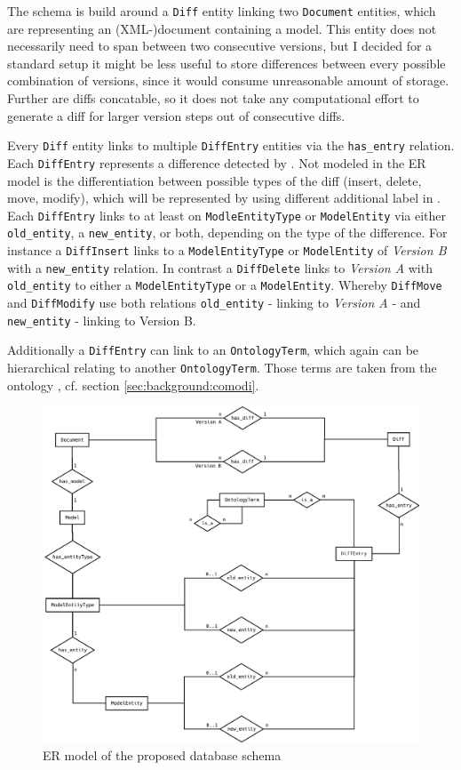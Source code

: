 The schema is build around a \texttt{Diff} entity linking two \texttt{Document} entities, which are representing an (XML-)document containing a model. This entity does not necessarily need to span between two consecutive versions, but I decided for a standard setup it might be less useful to store differences between every possible combination of versions, since it would consume unreasonable amount of storage. Further are diffs concatable, so it does not take any computational effort to generate a diff for larger version steps out of consecutive diffs.

Every \texttt{Diff} entity links to multiple \texttt{DiffEntry} entities via the \texttt{has\_entry} relation. Each \texttt{DiffEntry} represents a difference detected by \bives \cite{Scharm2015}. Not modeled in the ER model is the differentiation between possible types of the diff (insert, delete, move, modify), which will be represented by using different additional label in \neoj.
Each \texttt{DiffEntry} links to at least on \texttt{ModleEntityType} or \texttt{ModelEntity} via either \texttt{old\_entity}, a \texttt{new\_entity}, or both, depending on the type of the difference.
For instance a \texttt{DiffInsert} links to a \texttt{ModelEntityType} or \texttt{ModelEntity} of \emph{Version B} with a \texttt{new\_entity} relation.
In contrast a \texttt{DiffDelete} links to \emph{Version A} with \texttt{old\_entity} to either a \texttt{ModelEntityType} or a \texttt{ModelEntity}. Whereby \texttt{DiffMove} and \texttt{DiffModify} use both relations \texttt{old\_entity} - linking to \emph{Version A} - and \texttt{new\_entity} - linking to Version B.

Additionally a \texttt{DiffEntry} can link to an \texttt{OntologyTerm}, which again can be hierarchical relating to another \texttt{OntologyTerm}. Those terms are taken from the \comodi ontology \cite{Scharm2016}, cf. section \ref{sec:background:comodi}.


\begin{figure}
	\centering
	\includegraphics[width=\textwidth]{resources/db-concept-er.pdf}
	\caption{ER model of the proposed database schema}
	\label{fig:db-er-model}
\end{figure}

